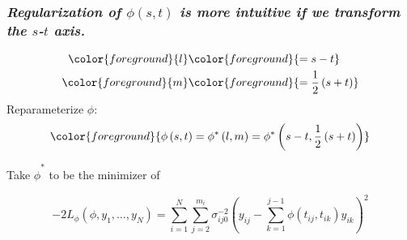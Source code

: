 \documentclass[12pt]{beamer}
\newcommand{\newmaththought}[1]{{ \color{foreground} {#1}}}
\begin{document}
\begin{frame}
\frametitle{\emph{Regularization of $\phi\left(s,t\right)$ is more intuitive if we transform the $s$-$t$ axis. }}

\begin{align*}
\newmaththought{l} &\newmaththought{= s-t} \\
\newmaththought{m} &\newmaththought{= \frac{1}{2}\left(s+t\right)}
\end{align*}
\noindent
Reparameterize $\phi$:
\begin{align*}
\newmaththought{\phi\left(s,t\right) =\phi^*\left(l,m\right)= \phi^*\left(s-t, \frac{1}{2}\left(s+t\right)\right)}
\end{align*}

Take $\hat{\phi}^*$ to be the minimizer of 
\begin{adjustwidth}{-2cm}{-2cm}
\begin{equation}
-2 L_\phi\left(\phi, y_1, \dots,y_N \right) = \sum_{i=1}^N \sum_{j=2}^{m_i} \sigma_{ij0}^{-2} \left(y_{ij} - \sum_{k=1}^{j-1}\phi\left({t_{ij},t_{ik}}\right)y_{ik} \right)^2 \label{loglikelihood}
\end{equation}
\end{adjustwidth}

\end{frame}






%
%
\end{document}
